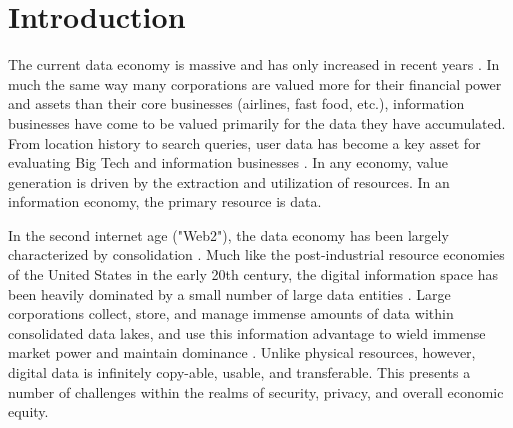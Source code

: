 \section{Introduction}

The current data economy is massive and has only increased in recent years \cite{DataAssetValuation}\cite{DataEconomyCitzenConsumer}\cite{DataEconomyValueOfData}. In much the same way many corporations are valued more for their financial power and assets than their core businesses (airlines, fast food, etc.), information businesses have come to be valued primarily for the data they have accumulated. From location history to search queries, user data has become a key asset for evaluating Big Tech and information businesses \cite{vectorsOfDigitalTransformation}\cite{industrialPolicyDataDriven}. In any economy, value generation is driven by the extraction and utilization of resources. In an information economy, the primary resource is data.

In the second internet age ("Web2"), the data economy has been largely characterized by consolidation \cite{ConsolitdationWeb}\cite{ConsolitdationInternetEconomy}. Much like the post-industrial resource economies of the United States in the early 20th century, the digital information space has been heavily dominated by a small number of large data entities \cite{DataAssetValuation}. Large corporations collect, store, and manage immense amounts of data within consolidated data lakes, and use this information advantage to wield immense market power and maintain dominance \cite{DataOwnershipBigTechAccessControl}. Unlike physical resources, however, digital data is infinitely copy-able, usable, and transferable. This presents a number of challenges within the realms of security, privacy, and overall economic equity.

